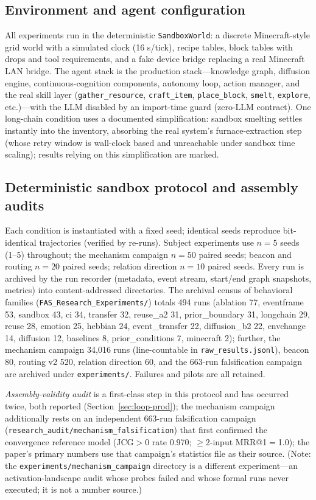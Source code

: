 \documentclass[10pt,a4paper]{article}
\begin{document}
\subsection{Environment and agent configuration}
All experiments run in the deterministic \texttt{SandboxWorld}: a discrete Minecraft-style grid world with a simulated clock (16 s/tick), recipe tables, block tables with drops and tool requirements, and a fake device bridge replacing a real Minecraft LAN bridge. The agent stack is the production stack---knowledge graph, diffusion engine, continuous-cognition components, autonomy loop, action manager, and the real skill layer (\texttt{gather\_resource}, \texttt{craft\_item}, \texttt{place\_block}, \texttt{smelt}, \texttt{explore}, etc.)---with the LLM disabled by an import-time guard (zero-LLM contract). One long-chain condition uses a documented simplification: sandbox smelting settles instantly into the inventory, absorbing the real system's furnace-extraction step (whose retry window is wall-clock based and unreachable under sandbox time scaling); results relying on this simplification are marked.

\subsection{Deterministic sandbox protocol and assembly audits}
Each condition is instantiated with a fixed seed; identical seeds reproduce bit-identical trajectories (verified by re-runs). Subject experiments use $n{=}5$ seeds (1--5) throughout; the mechanism campaign $n{=}50$ paired seeds; beacon and routing $n{=}20$ paired seeds; relation direction $n{=}10$ paired seeds. Every run is archived by the run recorder (metadata, event stream, start/end graph snapshots, metrics) into content-addressed directories. The archival census of behavioral families (\verb|FAS_Research_Experiments/|) totals 494 runs (ablation 77, eventframe 53, sandbox 43, ci 34, transfer 32, reuse\_a2 31, prior\_boundary 31, longchain 29, reuse 28, emotion 25, hebbian 24, event\_transfer 22, diffusion\_b2 22, envchange 14, diffusion 12, baselines 8, prior\_conditions 7, minecraft 2); further, the mechanism campaign 34{,}016 runs (line-countable in \verb|raw_results.jsonl|), beacon 80, routing v2 520, relation direction 60, and the 663-run falsification campaign are archived under \verb|experiments/|. Failures and pilots are all retained.

\emph{Assembly-validity audit} is a first-class step in this protocol and has occurred twice, both reported (Section~\ref{sec:loop-prod}); the mechanism campaign additionally rests on an independent 663-run falsification campaign (\texttt{research\_audit/mechanism\_falsification}) that first confirmed the convergence reference model (JCG$>{0}$ rate 0.970; $\ge$2-input MRR@1$=$1.0); the paper's primary numbers use that campaign's statistics file as their source. (Note: the \texttt{experiments/mechanism\_campaign} directory is a different experiment---an activation-landscape audit whose probes failed and whose formal runs never executed; it is not a number source.)
\end{document}
